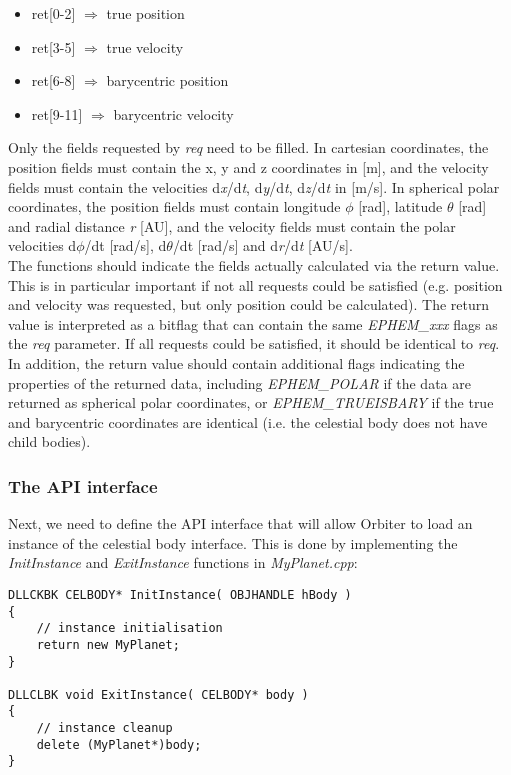 \documentclass[Orbiter Developer Manual.tex]{subfiles}
\begin{document}
\begin{itemize}
\item ret[0-2] $\Rightarrow$ true position
\item ret[3-5] $\Rightarrow$ true velocity
\item ret[6-8] $\Rightarrow$ barycentric position
\item ret[9-11] $\Rightarrow$ barycentric velocity
\end{itemize}

\noindent
Only the fields requested by \textit{req} need to be filled. In cartesian coordinates, the position fields must contain the x, y and z coordinates in [m], and the velocity fields must contain the velocities d\textit{x}/d\textit{t}, d\textit{y}/d\textit{t}, d\textit{z}/d\textit{t} in [m/s]. In spherical polar coordinates, the position fields must contain longitude $\phi$ [rad], latitude $\theta$ [rad] and radial distance \textit{r} [AU], and the velocity fields must contain the polar velocities d$\phi$/dt [rad/s], d$\theta$/dt [rad/s] and d\textit{r}/d\textit{t} [AU/s].\\
The functions should indicate the fields actually calculated via the return value. This is in particular important if not all requests could be satisfied (e.g. position and velocity was requested, but only position could be calculated). The return value is interpreted as a bitflag that can contain the same \textit{EPHEM\_xxx} flags as the \textit{req} parameter. If all requests could be satisfied, it should be identical to \textit{req}. In addition, the return value should contain additional flags indicating the properties of the returned data, including \textit{EPHEM\_POLAR} if the data are returned as spherical polar coordinates, or \textit{EPHEM\_TRUEISBARY} if the true and barycentric coordinates are identical (i.e. the celestial body does not have child bodies).


\subsubsection{The API interface}
Next, we need to define the API interface that will allow Orbiter to load an instance of the celestial body interface. This is done by implementing the \textit{InitInstance} and \textit{ExitInstance} functions in \textit{MyPlanet.cpp}:

\begin{lstlisting}
DLLCKBK CELBODY* InitInstance( OBJHANDLE hBody )
{
	// instance initialisation
	return new MyPlanet;
}

DLLCLBK void ExitInstance( CELBODY* body )
{
	// instance cleanup
	delete (MyPlanet*)body;
}
\end{lstlisting}
\end{document}
